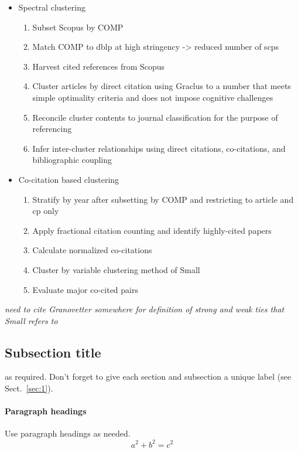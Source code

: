 \begin{itemize}
\item Spectral clustering
\begin{enumerate}
\item Subset Scopus by COMP
\item Match COMP to dblp at high stringency -> reduced number of scps
 \item Harvest cited references  from Scopus
 \item Cluster articles by direct citation using Graclus to a number that meets simple optimality criteria and does not impose cognitive challenges
 \item Reconcile cluster contents to journal classification for the purpose of referencing
 \item Infer inter-cluster relationships using direct citations, co-citations, and bibliographic coupling
\end{enumerate}
\item Co-citation based clustering
\begin{enumerate}
\item Stratify by year after subsetting by COMP and restricting to article and cp only
\item Apply fractional citation counting and identify highly-cited papers
\item Calculate normalized co-citations
\item Cluster by variable clustering method of Small
\item Evaluate major co-cited pairs
\end{enumerate}
\end{itemize}

\emph{need to cite Granovetter somewhere for definition of strong and weak ties that Small refers to}



\subsection{Subsection title}
\label{sec:2}
as required. Don't forget to give each section
and subsection a unique label (see Sect.~\ref{sec:1}).
\paragraph{Paragraph headings} Use paragraph headings as needed.
\begin{equation}
a^2+b^2=c^2
\end{equation}

